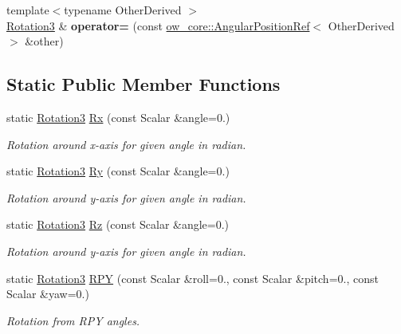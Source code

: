 \begin{DoxyCompactItemize}
\item 
{\footnotesize template$<$typename Other\+Derived $>$ }\\\hyperlink{classow__core_1_1Rotation3}{Rotation3} \& {\bfseries operator=} (const \hyperlink{classow__core_1_1AngularPositionRef}{ow\+\_\+core\+::\+Angular\+Position\+Ref}$<$ Other\+Derived $>$ \&other)\hypertarget{classow__core_1_1Rotation3_a0e93e4bfb4e9bca641fdb88cea778f93}{}\label{classow__core_1_1Rotation3_a0e93e4bfb4e9bca641fdb88cea778f93}

\end{DoxyCompactItemize}
\subsection*{Static Public Member Functions}
\begin{DoxyCompactItemize}
\item 
static \hyperlink{classow__core_1_1Rotation3}{Rotation3} \hyperlink{classow__core_1_1Rotation3_a021f317643aace80e3b70edac5e38ced}{Rx} (const Scalar \&angle=0.)
\begin{DoxyCompactList}\small\item\em Rotation around x-\/axis for given angle in radian. \end{DoxyCompactList}\item 
static \hyperlink{classow__core_1_1Rotation3}{Rotation3} \hyperlink{classow__core_1_1Rotation3_ad9ec395e9bdd0495215d9f52d9237c81}{Ry} (const Scalar \&angle=0.)
\begin{DoxyCompactList}\small\item\em Rotation around y-\/axis for given angle in radian. \end{DoxyCompactList}\item 
static \hyperlink{classow__core_1_1Rotation3}{Rotation3} \hyperlink{classow__core_1_1Rotation3_aa1cca570a650d8caed40a091186b8569}{Rz} (const Scalar \&angle=0.)
\begin{DoxyCompactList}\small\item\em Rotation around y-\/axis for given angle in radian. \end{DoxyCompactList}\item 
static \hyperlink{classow__core_1_1Rotation3}{Rotation3} \hyperlink{classow__core_1_1Rotation3_ad24179671e2253a9ef79a4f88a8466f2}{R\+PY} (const Scalar \&roll=0., const Scalar \&pitch=0., const Scalar \&yaw=0.)
\begin{DoxyCompactList}\small\item\em Rotation from R\+PY angles. \end{DoxyCompactList}\item 

\end{DoxyCompactItemize}
